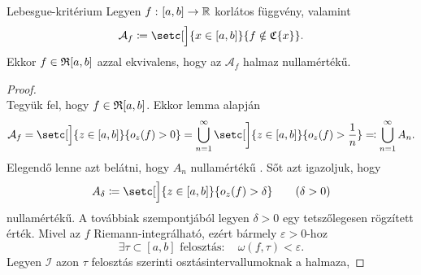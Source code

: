 \documentclass[
]{elteikthesis}[2024/04/26]
\begin{document}
	\begin{theorem}{Lebesgue-kritérium}{}
		Legyen \( f \,\colon [a, b] \to \mathbb{R} \) korlátos függvény, valamint
		\[
			\mathcal{A}_f \coloneq \setc[\Big]{ x \in [a, b] }{ f \notin \ContAt{x} }.
		\]
		Ekkor \( f \in \mathfrak{R}{[a, b]} \) azzal ekvivalens, 
		hogy az \( \mathcal{A}_f \) halmaz nullamértékű.
	\end{theorem}
	\begin{proof}\,\\[6pt]
		\Ifstep
		Tegyük fel, hogy \( f \in \mathfrak{R}{[a,b]} \). 
		Ekkor  lemma alapján
		\[
			\mathcal{A}_f = 
			\setc[\Big]{ z \in [a, b] }{ o_z(f) > 0 } =
			\bigcup_{n = 1}^{\infty} \setc[\bigg]{ z \in [a, b] }{ o_z(f) > \frac{1}{n} }
			\eqcolon \bigcup_{n = 1}^{\infty} A_n.
		\]
		Elegendő lenne azt belátni, hogy \( A_n \) nullamértékű%
		.
		Sőt azt igazoljuk, hogy
		\[
			A_\delta \coloneq 
			\setc[\Big]{ z \in [a, b] }{ o_z(f) > \delta }
			\qquad (\delta > 0)
		\]
		nullamértékű. 
		A továbbiak szempontjából legyen \( \delta > 0 \) egy tetszőlegesen rögzített érték.
		Mivel az \( f \) Riemann-integrálható, ezért bármely \( \varepsilon > 0 \)-hoz
		\[
			\exists \tau \subset [a, b] \text{ felosztás} \colon \quad
			\omega(f, \tau) < \varepsilon.
		\]
		Legyen \( \mathcal{I} \) azon \( \tau \) felosztás szerinti osztásintervallumoknak a halmaza,
\end{proof}
\end{document}
